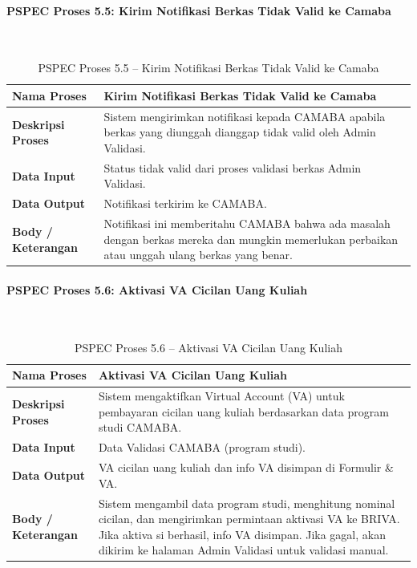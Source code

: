 \paragraph{PSPEC Proses 5.5: Kirim Notifikasi Berkas Tidak Valid ke Camaba}~\\
\begin{longtable}{|p{}|p{}|}
	\caption{PSPEC Proses 5.5 -- Kirim Notifikasi Berkas Tidak Valid ke Camaba}
	\label{table:3.pspec55}\\
	\hline
	\textbf{Nama Proses} & Kirim Notifikasi Berkas Tidak Valid ke Camaba \\
	\hline
	\textbf{Deskripsi Proses} & Sistem mengirimkan notifikasi kepada CAMABA apabila berkas yang diunggah dianggap tidak valid oleh Admin Validasi. \\
	\hline
	\textbf{Data Input} & Status tidak valid dari proses validasi berkas Admin Validasi. \\
	\hline
	\textbf{Data Output} & Notifikasi terkirim ke CAMABA. \\
	\hline
	\textbf{Body / Keterangan} & Notifikasi ini memberitahu CAMABA bahwa ada masalah dengan berkas mereka dan mungkin memerlukan perbaikan atau unggah ulang berkas yang benar. \\
	\hline
\end{longtable}

\paragraph{PSPEC Proses 5.6: Aktivasi VA Cicilan Uang Kuliah}~\\
\begin{longtable}{|p{}|p{}|}
	\caption{PSPEC Proses 5.6 -- Aktivasi VA Cicilan Uang Kuliah}
	\label{table:3.pspec56}\\
	\hline
	\textbf{Nama Proses} & Aktivasi VA Cicilan Uang Kuliah \\
	\hline
	\textbf{Deskripsi Proses} & Sistem mengaktifkan Virtual Account (VA) untuk pembayaran cicilan uang kuliah berdasarkan data program studi CAMABA. \\
	\hline
	\textbf{Data Input} & Data Validasi CAMABA (program studi). \\
	\hline
	\textbf{Data Output} & VA cicilan uang kuliah dan info VA disimpan di Formulir \& VA. \\
	\hline
	\textbf{Body / Keterangan} & Sistem mengambil data program studi, menghitung nominal cicilan, dan mengirimkan permintaan aktivasi VA ke BRIVA. Jika aktiva si berhasil, info VA disimpan. Jika gagal, akan dikirim ke halaman Admin Validasi untuk validasi manual. \\
	\hline
\end{longtable}

